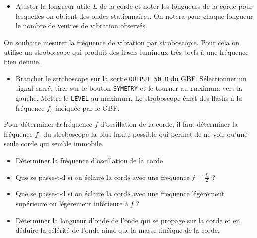 \documentclass[]{tp}
\begin{document}
\begin{itemize}
  \item Ajuster la longueur utile $L$ de la corde et noter les longueurs de la corde pour lesquelles on obtient des ondes stationnaires. On notera pour chaque longueur le nombre de ventres de vibration observés.
\end{itemize}


On souhaite mesurer la fréquence de vibration par stroboscopie. Pour cela on utilise un stroboscope qui produit des flashs lumineux très brefs à une fréquence bien définie.

\begin{itemize}
  \item Brancher le stroboscope sur la sortie \texttt{OUTPUT \SI{50}{\ohm}} du GBF. Sélectionner un signal carré, tirer sur le bouton \texttt{SYMETRY} et le tourner au maximum vers la gauche. Mettre le \texttt{LEVEL} au maximum. Le stroboscope émet des flashs à la fréquence $f_s$ indiquée par le GBF. 
\end{itemize}

Pour déterminer la fréquence $f$ d'oscillation de la corde, il faut déterminer la fréquence $f_s$ du stroboscope la plus haute possible qui permet de ne voir qu'une seule corde qui semble immobile. 

\begin{itemize}
  \item Déterminer la fréquence d'oscillation de la corde
  \item Que se passe-t-il si on éclaire la corde avec une fréquence $f=\frac{f_s}{2}$ ?
  \item Que se passe-t-il si on éclaire la corde avec une fréquence légèrement supérieure ou légèrement inférieure à $f$ ? 

  \item Déterminer la longueur d'onde de l'onde qui se propage sur la corde et en déduire la célérité de l'onde ainsi que la masse linéique de la corde.
\end{itemize}
\end{document}
